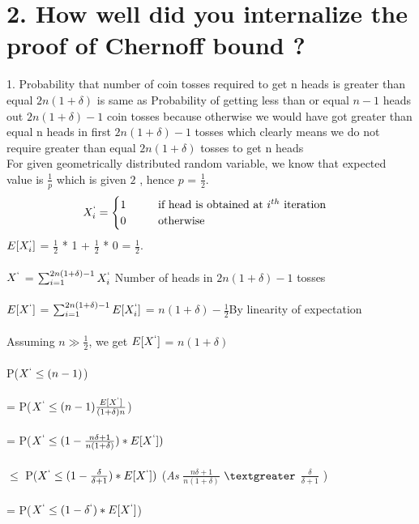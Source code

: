 \documentclass{article}
\begin{document}
\section*{2. How well did you internalize the proof of Chernoff bound ?} 
1. Probability that number of coin tosses required to get n heads is greater than equal $2n(1 + \delta)$ is same as Probability of getting less than or equal $n-1$ heads out $2n(1 + \delta) - 1$ coin tosses because otherwise we would have got greater than equal n heads in first  $2n(1 + \delta) - 1$ tosses which clearly means we do not require greater than equal $2n(1 + \delta)$ tosses to get n heads \\ 
For given geometrically distributed random variable, we know that expected value is $\frac{1}{p}$ which is given $2$ , hence $p$ = $\frac{1}{2}$. \\
\[
	X_i^{`} =\begin{cases}
		1  \hspace{1cm}   $if head is obtained at $i^{th}$ iteration$ \\
		0  \hspace{1cm}   $otherwise$ 
		\end{cases}
\] 
$E[X_i^{`}]$ = $\frac{1}{2}$ * 1 + $\frac{1}{2}$ * 0 = $\frac{1}{2}$. \\\\
$X^{`}$ = $\sum_{i=1}^{2n(1 + \delta) - 1}X_i^{`}$ \hfill{Number of heads in $2n(1 + \delta) - 1$} tosses\\\\
$E[X^{`}]$ = $\sum_{i=1}^{2n(1 + \delta) - 1}E[X_i^{`}]$  = $n(1+\delta) - \frac{1}{2}$\hfill{By linearity of expectation}\\\\
Assuming $n \gg \frac{1}{2}$, we get $E[X^{`}]$ =  $n(1+\delta) $ \\\\
P($X^{`} \leq (n-1)$) \\\\
= P($X^{`} \leq (n-1)\frac{E[X^{`}]}{(1 + \delta)n}$)\\\\
= P($X^{`} \leq (1 - \frac{n\delta+1}{n(1+\delta)})*E[X^{`}])$ \\\\
$\leq$ P($X^{`} \leq (1 - \frac{\delta}{\delta + 1})*E[X^{`}])$ \hfill{(\textit{As} $\frac{n\delta+1}{n(1+\delta)}$ $\textgreater$ $\frac{\delta}{\delta + 1}$ )}\\\\
= P($X^{`} \leq (1 - \delta^{`})*E[X^{`}] $)
\end{document}
